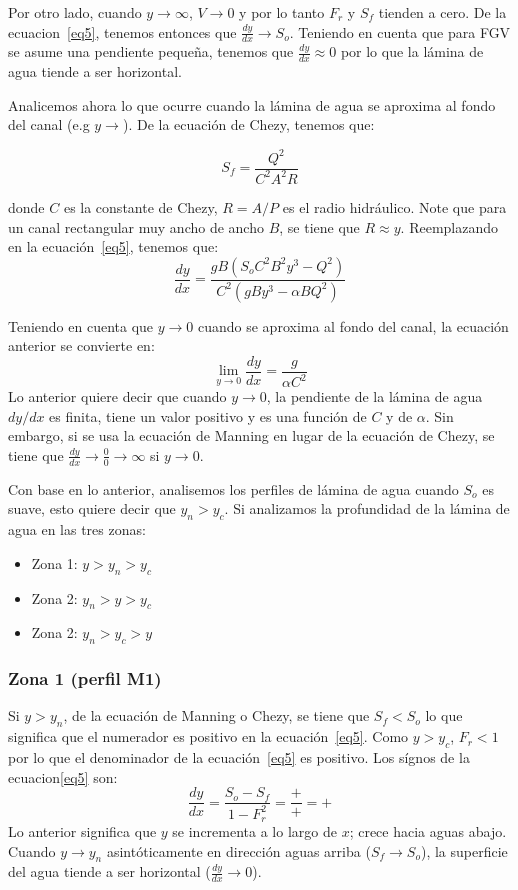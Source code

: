 \documentclass[11pt, oneside]{article}
\begin{document}
Por otro lado, cuando $y \rightarrow \infty$, $V \rightarrow 0$ y por lo tanto $F_r$ y $S_f$ tienden a cero. De la ecuacion~\ref{eq5}, tenemos entonces que $\frac{dy}{dx} \rightarrow S_o$. Teniendo en cuenta que para FGV se asume una pendiente pequeña, tenemos que $\frac{dy}{dx} \approx 0$ por lo que la l\'amina de agua tiende  a ser horizontal. 

Analicemos ahora lo que ocurre cuando la l\'amina de agua se aproxima al fondo del canal (e.g $y \rightarrow$). De la ecuaci\'on de Chezy, tenemos que:

$$
S_f = \frac{Q^2}{C^2 A^2 R}
$$

donde $C$ es la constante de Chezy, $R= A/P$ es el radio hidr\'aulico. Note que para un canal rectangular muy ancho de ancho $B$, se tiene que $R \approx y$. Reemplazando en la ecuaci\'on~\ref{eq5}, tenemos que:
$$
\frac{dy}{dx} = \frac{gB \left(S_o C^2 B^2 y^3 - Q^2\right)}{C^2 \left(gBy^3 -\alpha B Q^2\right)}
$$

Teniendo en cuenta que $y\rightarrow 0$ cuando se aproxima al fondo del canal, la ecuaci\'on anterior se convierte en:
$$
\lim_{y \to 0} \frac{dy}{dx} = \frac{g}{\alpha C^2}
$$
Lo anterior quiere decir que cuando $y \rightarrow 0$, la pendiente de la l\'amina de agua $dy/dx$ es finita, tiene un valor positivo y es una funci\'on de $C$ y de $\alpha$. Sin embargo, si se usa la ecuaci\'on de Manning en lugar de la ecuaci\'on de Chezy, se tiene que $\frac{dy}{dx} \rightarrow \frac{0}{0} \rightarrow \infty$ si $y \rightarrow 0$.

Con base en lo anterior, analisemos los perfiles de l\'amina de agua cuando $S_o$ es suave, esto quiere decir que $y_n > y_c$. Si analizamos la profundidad de la l\'amina de agua en las tres zonas:
\begin{itemize}
    \item Zona 1: $y > y_n > y_c$
    \item Zona 2: $y_n > y > y_c$
    \item Zona 2: $y_n > y_c > y$
\end{itemize}

\subsubsection*{Zona 1 (perfil M1)}
Si $y > y_n$, de la ecuaci\'on de Manning o Chezy, se tiene que $S_f < S_o$ lo que significa que el numerador es positivo  en la ecuaci\'on~\ref{eq5}. Como $y > y_c$, $F_r < 1$ por lo que el denominador de la ecuaci\'on~\ref{eq5} es positivo. Los s\'ignos de la ecuacion\ref{eq5} son:
$$
\frac{dy}{dx} = \frac{S_o - S_f}{1-F_r^2} = \frac{+}{+} = +
$$
Lo anterior significa que $y$ se incrementa a lo largo de $x$; crece hacia aguas abajo. Cuando $y \rightarrow y_n$ asint\'oticamente en direcci\'on aguas arriba ($S_f \rightarrow S_o$), la superficie del agua tiende a ser horizontal ($\frac{dy}{dx}\rightarrow 0$).  
\end{document}
